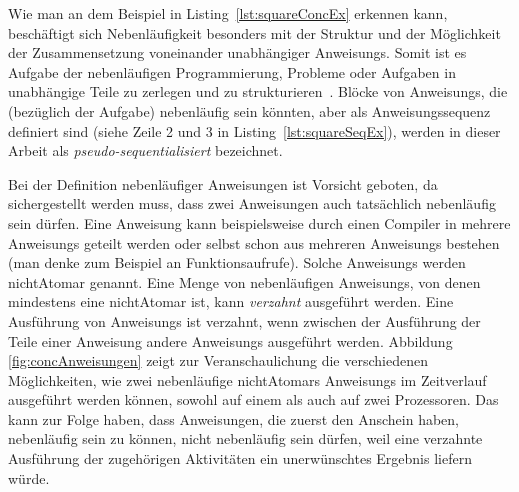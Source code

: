 Wie man an dem Beispiel in Listing~\ref{lst:squareConcEx} erkennen kann, beschäftigt sich Nebenläufigkeit besonders mit der Struktur und der Möglichkeit der Zusammensetzung voneinander unabhängiger \glspl{Anweisung}. Somit ist es Aufgabe der nebenläufigen Programmierung, Probleme oder Aufgaben in unabhängige Teile zu zerlegen und zu strukturieren~\cite{Pike2012,Hettel2016}. Blöcke von \glspl{Anweisung}, die (bezüglich der Aufgabe) nebenläufig sein könnten, aber als Anweisungssequenz definiert sind (siehe Zeile 2 und 3 in Listing~\ref{lst:squareSeqEx}), werden in dieser Arbeit als \emph{pseudo-sequentialisiert} bezeichnet.

Bei der Definition nebenläufiger Anweisungen ist Vorsicht geboten, da sichergestellt werden muss, dass zwei Anweisungen auch tatsächlich nebenläufig sein dürfen. Eine \gls{Anweisung} kann beispielsweise durch einen Compiler in mehrere \glspl{Anweisung} geteilt werden oder selbst schon aus mehreren \glspl{Anweisung} bestehen (man denke zum Beispiel an Funktionsaufrufe). Solche \glspl{Anweisung} werden \gls{nichtAtomar} genannt. Eine Menge von nebenläufigen \glspl{Anweisung}, von denen mindestens eine \gls{nichtAtomar} ist, kann \emph{verzahnt} ausgeführt werden. Eine Ausführung von \glspl{Anweisung} ist verzahnt, wenn zwischen der Ausführung der Teile einer  \gls{Anweisung} andere \glspl{Anweisung} ausgeführt werden. Abbildung \ref{fig:concAnweisungen} zeigt zur Veranschaulichung die verschiedenen Möglichkeiten, wie zwei nebenläufige \glspl{nichtAtomar} \glspl{Anweisung} im Zeitverlauf ausgeführt werden können, sowohl auf einem als auch auf zwei Prozessoren. Das kann zur Folge haben, dass Anweisungen, die zuerst den Anschein haben, nebenläufig sein zu können, nicht nebenläufig sein dürfen, weil eine verzahnte Ausführung der zugehörigen Aktivitäten ein unerwünschtes Ergebnis liefern würde. 

